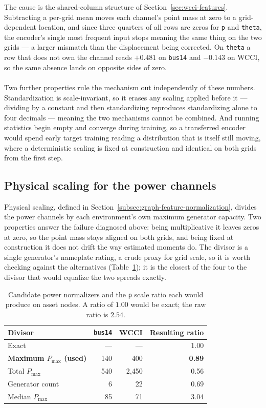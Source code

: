 \noindent The cause is the shared-column structure of
Section~\ref{sec:wcci-features}. Subtracting a per-grid mean moves each channel's
point mass at zero to a grid-dependent location, and since three quarters of all
rows are zeros for \texttt{p} and \texttt{theta}, the encoder's single most
frequent input stops meaning the same thing on the two grids --- a larger
mismatch than the displacement being corrected. On \texttt{theta} a row that does
not own the channel reads $+0.481$ on \texttt{bus14} and $-0.143$ on WCCI, so the
same absence lands on opposite sides of zero.
\\
\\
Two further properties rule the mechanism out independently of these numbers.
Standardization is scale-invariant, so it erases any scaling applied before it
--- dividing by a constant and then standardizing reproduces standardizing alone
to four decimals --- meaning the two mechanisms cannot be combined. And running
statistics begin empty and converge during training, so a transferred encoder
would spend early target training reading a distribution that is itself still
moving, where a deterministic scaling is fixed at construction and identical on
both grids from the first step.

\subsection{Physical scaling for the power channels}
\label{sec:wcci-physical-scaling}

Physical scaling, defined in Section~\ref{subsec:graph-feature-normalization},
divides the power channels by each environment's own maximum generator capacity.
Two properties answer the failure diagnosed above: being multiplicative it
leaves zeros at zero, so the point mass stays aligned on both grids, and being
fixed at construction it does not drift the way estimated moments do. The
divisor is a single generator's nameplate rating, a crude proxy for grid scale,
so it is worth checking against the alternatives
(Table~\ref{tab:wcci-normalizer}); it is the closest of the four to the divisor
that would equalize the two spreads exactly.

\begin{table}[H]
  \centering
  \small
  \caption{Candidate power normalizers and the \texttt{p} scale ratio each would
  produce on asset nodes. A ratio of $1.00$ would be exact; the raw ratio is
  $2.54$.}
  \label{tab:wcci-normalizer}
  \setlength{\tabcolsep}{8pt}
  \begin{tabular}{lrrr}
    \toprule
    Divisor & \texttt{bus14} & WCCI & Resulting ratio \\
    \midrule
    Exact & --- & --- & 1.00 \\
    \textbf{Maximum $P_{\max}$ (used)} & 140 & 400 & \textbf{0.89} \\
    Total $P_{\max}$ & 540 & 2{,}450 & 0.56 \\
    Generator count & 6 & 22 & 0.69 \\
    Median $P_{\max}$ & 85 & 71 & 3.04 \\
    \bottomrule
  \end{tabular}
\end{table}

